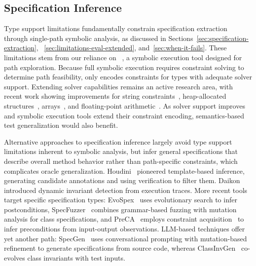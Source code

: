 \subsection{Specification Inference}%
\label{sec:rw-inference}

Type support limitations fundamentally constrain
specification extraction through single-path symbolic analysis,
as discussed in Sections~\ref{sec:specification-extraction},
~\ref{sec:limitations-eval-extended}, and~\ref{sec:when-it-fails}.
These limitations stem from our reliance on \ToolSPF{}~\cite{pasareanu_2013_symbolic},
a symbolic execution tool designed for path exploration.
Because full symbolic execution requires constraint solving
to determine path feasibility,
\ToolSPF{} only encodes constraints for types with adequate solver support.
Extending solver capabilities remains an active research area,
with recent work showing improvements for
string constraints~\cite{chen_2024_z3noodler,lotz_2025_s2s,chen_2025_ostrich2},
heap-allocated structures~\cite{copia_2022_lissa,copia_2023_pli,braione_2016_jbse},
arrays~\cite{niemetz_2023_bitwuzla},
and floating-point arithmetic~\cite{yang_2025_floating_point}.
As solver support improves and symbolic execution tools
extend their constraint encoding,
semantics-based test generalization would also benefit.

Alternative approaches to specification inference
largely avoid type support limitations inherent to symbolic analysis,
but infer general specifications that describe overall method behavior
rather than path-specific constraints, which complicates oracle generalization.
Houdini~\cite{flanagan_2001_houdini} pioneered template-based inference,
generating candidate annotations and using verification to filter them.
Daikon~\cite{ernst_2007_daikon} introduced dynamic invariant detection from execution traces.
More recent tools target specific specification types:
EvoSpex~\cite{molina_2023_evospex} uses evolutionary search to infer postconditions,
SpecFuzzer~\cite{molina_2022_specfuzzer} combines grammar-based fuzzing with mutation analysis
for class specifications,
and PreCA~\cite{menguy_2022_preca} employs constraint acquisition~\cite{bessiere_2017_constraint_acquisition}
to infer preconditions from input-output observations.
LLM-based techniques offer yet another path:
SpecGen~\cite{ma_2025_specgen} uses conversational prompting
with mutation-based refinement to generate specifications from source code,
whereas ClassInvGen~\cite{sun_2025_classinvgen} co-evolves class invariants with test inputs.


